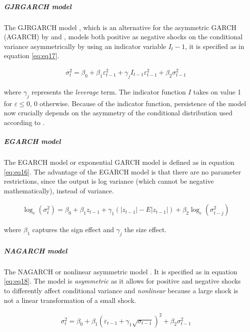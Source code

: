 \documentclass[a4paper, twoside]{templates/ociamthesis}
\begin{document}
\hypertarget{gjrgarch-model}{%
\subparagraph{GJRGARCH model}\label{gjrgarch-model}}

\noindent The GJRGARCH model \autocite{glosten1993}, which is an alternative for the asymmetric GARCH (AGARCH) by \textcite{engle1990} and \textcite{engle1993}, models both positive as negative shocks on the conditional variance asymmetrically by using an indicator variable \(I_t-1\), it is specified as in equation \eqref{eq:eq17}.

\begin{align}
\sigma_t^2 = \beta_0 + \beta_1 \varepsilon_{t-1}^2 + \gamma_j I_{t-1} \varepsilon_{t-1}^2 + \beta_2 \sigma_{t-1}^2
 \label{eq:eq17}
\end{align}

\noindent where \(\gamma_j\) represents the \emph{leverage} term. The indicator function \(I\) takes on value 1 for \(\varepsilon \le 0\), 0 otherwise. Because of the indicator function, persistence of the model now crucially depends on the asymmetry of the conditional distribution used according to \textcite{ghalanos2020}.

\hypertarget{egarch-model}{%
\subparagraph{EGARCH model}\label{egarch-model}}

\noindent The EGARCH model or exponential GARCH model \autocite{nelson1991} is defined as in equation \eqref{eq:eq16}. The advantage of the EGARCH model is that there are no parameter restrictions, since the output is log variance (which cannot be negative mathematically), instead of variance.

\begin{align}
\log_e(\sigma_t^2) = \beta_0 + \beta_1 z_{t-1} + \gamma_1 (|z_{t-1}| - E|z_{t-1}|)+ \beta_2 \log_e(\sigma_{t-j}^2)
 \label{eq:eq16}
\end{align}

\noindent where \(\beta_1\) captures the sign effect and \(\gamma_j\) the size effect.

\hypertarget{nagarch-model}{%
\subparagraph{NAGARCH model}\label{nagarch-model}}

\noindent The NAGARCH or nonlinear asymmetric model \autocite{engle1993}. It is specified as in equation \eqref{eq:eq18}. The model is \emph{asymmetric} as it allows for positive and negative shocks to differently affect conditional variance and \emph{nonlinear} because a large shock is not a linear transformation of a small shock.

\begin{align}
\sigma_t^2 = \beta_0 + \beta_1 (\varepsilon_{t-1}+ \gamma_1 \sqrt{\sigma_{t-1}})^2 + \beta_2 \sigma_{t-1}^2
 \label{eq:eq18}
\end{align}
\end{document}
